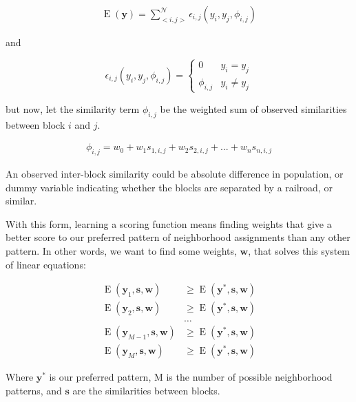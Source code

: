 \begin{align}
\operatorname{E}(\mathbf{y}) = \sum_{<i,j>}^{\mathcal{N}}\epsilon_{i,j}(y_i,y_j,\phi_{i,j})
\end{align}

\noindent
and

\begin{equation}
\epsilon_{i,j}(y_i,y_j,\phi_{i,j}) = \begin{cases}
  0 &y_i = y_j \\
  \phi_{i,j} &y_i \neq y_j
\end{cases}
\end{equation}

\noindent
but now, let the similarity term $\phi_{i,j}$ be the weighted sum of
observed similarities between block $i$ and $j$. 

\begin{align}
\phi_{i,j} = w_0 + w_1s_{1,i,j} + w_2s_{2,i,j} + ... + w_ns_{n,i,j}
\end{align} 

\noindent
An observed inter-block similarity could be absolute difference in
population, or dummy variable indicating whether the blocks are
separated by a railroad, or similar.

\noindent

With this form, learning a scoring function means finding weights
that give a better score to our preferred pattern of neighborhood
assignments than any other pattern. In other words, we want to find
some weights, $\mathbf{w}$, that solves this system of linear
equations:

\begin{align*}
\operatorname{E}(\mathbf{y}_1, \mathbf{s}, \mathbf{w})
&\geq \operatorname{E}(\mathbf{y}^*, \mathbf{s}, \mathbf{w}) \\
\operatorname{E}(\mathbf{y}_2, \mathbf{s}, \mathbf{w})
&\geq \operatorname{E}(\mathbf{y}^*, \mathbf{s}, \mathbf{w}) \\
&\ldots \\
\operatorname{E}(\mathbf{y}_{M-1}, \mathbf{s}, \mathbf{w})
&\geq \operatorname{E}(\mathbf{y}^*, \mathbf{s}, \mathbf{w}) \\
\operatorname{E}(\mathbf{y}_{M}, \mathbf{s}, \mathbf{w})
&\geq \operatorname{E}(\mathbf{y}^*, \mathbf{s}, \mathbf{w})
\end{align*}

Where $\mathbf{y}^*$ is our preferred pattern, M is the number of
possible neighborhood patterns, and $\mathbf{s}$ are the similarities
between blocks.

